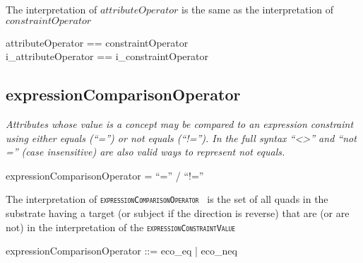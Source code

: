 \documentclass{article}
\def\spec#1{{\tt \small \textsc{{#1}} }}
\def\bnf#1{{\scriptsize {{#1}} }}
\def\desc#1{{\small \textsl{{#1}} }}
\begin{document}
The interpretation of $attributeOperator$ is the same as the interpretation of $constraintOperator$

\begin{zed}
attributeOperator == constraintOperator \\
i\_attributeOperator == i\_constraintOperator
\end{zed}

\subsection{expressionComparisonOperator}
\begin{framed}
\desc{Attributes whose value is a concept may be compared to an expression constraint using either equals (``='') or not equals (``!=''). In the full syntax ``<>'' and ``not ='' (case insensitive) are also  valid ways to represent not equals.}
\end{framed}

\begin{framed}
\noindent
\bnf{expressionComparisonOperator = ``='' / ``!=''}
\end{framed}

The interpretation of \spec{expressionComparisonOperator} is the set of all quads in the substrate having a target (or subject if the direction is reverse) that are (or are not) in
the interpretation of the \spec{expressionConstraintValue}


\begin{zed}
expressionComparisonOperator ::= eco\_eq | eco\_neq
\end{zed}
\end{document}

